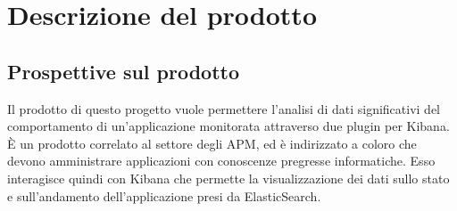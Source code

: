 \section{Descrizione del prodotto} \label{descrizione}
	\subsection{Prospettive sul prodotto}
	Il prodotto di questo progetto vuole permettere l'analisi di dati significativi del comportamento di un'applicazione monitorata attraverso due plugin per Kibana.
	È un prodotto correlato al settore degli APM, ed è indirizzato a coloro che devono amministrare applicazioni con conoscenze pregresse informatiche. Esso interagisce quindi con Kibana che permette la visualizzazione dei dati sullo stato e sull'andamento dell'applicazione presi da ElasticSearch.

